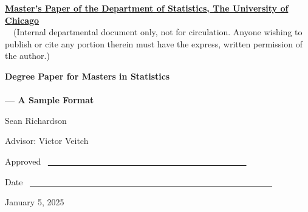 \documentclass{article}
\theoremstyle{definition}
\begin{document}
    
    \noindent
    \thispagestyle{empty}
    \underline{\bf Master's Paper of the Department of Statistics, The University of Chicago}
    \\~~(Internal departmental document only, not for circulation. Anyone wishing to publish or cite any portion therein must have the express, written permission of the author.)
    
    \vspace{1.8in}
    \begin{center}
    {\bf\LARGE Degree Paper for Masters in Statistics}
    \\~\\
    {\bf\Large --- A Sample Format}
    
    
    \vspace{1.4in}
    {\Large Sean Richardson}
    
    \vspace{1.3in}
    {\Large Advisor: Victor Veitch}
    
    \end{center}
    
    \vspace{.6in}
    {\Large Approved} ~\underline{~~~~~~~~~~~~~~~~~~
    ~~~~~~~~~~~~~~~~~~~~~~~~~~~~}
    
    \vspace{.2in}
    {\Large Date} ~\underline{~~~~~~~~~~~~~~~~~~~~~~~~~~~~~~~~~~~~~~~~~~~~~~~~~~~~~~~~~}
    
    \vfill
    \begin{center}{\large January 5, 2025}\end{center}
    
\end{document}
